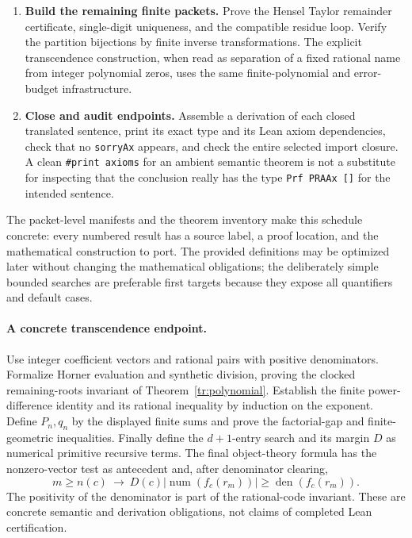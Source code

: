 \begin{enumerate}
\item \textbf{Build the remaining finite packets.} Prove the Hensel Taylor remainder certificate, single-digit uniqueness, and the compatible residue loop. Verify the partition bijections by finite inverse transformations. The explicit transcendence construction, when read as separation of a fixed rational name from integer polynomial zeros, uses the same finite-polynomial and error-budget infrastructure.
\item \textbf{Close and audit endpoints.} Assemble a derivation of each closed translated sentence, print its exact type and its Lean axiom dependencies, check that no \texttt{sorryAx} appears, and check the entire selected import closure. A clean \texttt{\#print axioms} for an ambient semantic theorem is not a substitute for inspecting that the conclusion really has the type \texttt{Prf PRAAx []} for the intended sentence.
\end{enumerate}

The packet-level manifests and the theorem inventory make this schedule concrete: every numbered result has a source label, a proof location, and the mathematical construction to port. The provided definitions may be optimized later without changing the mathematical obligations; the deliberately simple bounded searches are preferable first targets because they expose all quantifiers and default cases.

\paragraph{A concrete transcendence endpoint.}
Use integer coefficient vectors and rational pairs with positive
denominators. Formalize Horner evaluation and synthetic division, proving
the clocked remaining-roots invariant of Theorem~\ref{tr:polynomial}.
Establish the finite power-difference identity and its rational inequality
by induction on the exponent. Define $P_n,q_n$ by the displayed finite
sums and prove the factorial-gap and finite-geometric inequalities.
Finally define the $d+1$-entry search and its margin $D$ as numerical
primitive recursive terms. The final object-theory formula has the
nonzero-vector test as antecedent and, after denominator clearing,
\[
 m\ge n(c)\ \longrightarrow\ D(c)|\operatorname{num}(f_c(r_m))|
                    \ge\operatorname{den}(f_c(r_m)).
\]
The positivity of the denominator is part of the rational-code invariant.
These are concrete semantic and derivation obligations, not claims of
completed Lean certification.

